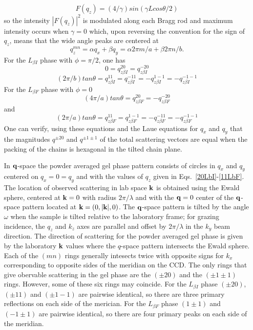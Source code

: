 \documentclass[
 preprint,
 showkeys, 
 amsmath,
 amssymb,
 aps,
]{revtex4-1}
\begin{document}
\begin{equation}\label{int}
F(q_z) = (4/\gamma)sin({\gamma}Lcos{\theta}/2)
\end{equation}
so the intensity $|F(q_z)|^2$ is modulated along each Bragg rod and maximum intensity occurs when $\gamma=0$ which, upon reversing the convention for the sign of $q_z$, means that the wide angle peaks are centered at
\begin{equation}\label{centers}
q_z^{mn}={\alpha}q_x+{\beta}q_y=\alpha2\pi{m}/a+\beta2\pi{n}/b.
\end{equation}
For the $L_{{\beta}I}$ phase with ${\phi}={\pi}/2$, one has
\begin{equation}\label{20LbI}
0=q_{z{\beta}I}^{20}=q_{z{\beta}I}^{-20}
\end{equation}
\begin{equation}\label{11LbI}
(2\pi/b)tan{\theta}=q_{z{\beta}I}^{11}=q_{z{\beta}I}^{-11}=-q_{z{\beta}I}^{1-1}=-q_{z{\beta}I}^{-1-1}
\end{equation}
For the $L_{{\beta}F}$ phase with ${\phi}=0$
\begin{equation}\label{20LbF}
(4\pi/a)tan{\theta}=q_{z{\beta}F}^{20}=-q_{z{\beta}F}^{-20}
\end{equation}
and
\begin{equation}\label{11LbF}
(2\pi/a)tan{\theta}=q_{z{\beta}F}^{11}=q_{z{\beta}F}^{1-1}=-q_{z{\beta}F}^{-11}=-q_{z{\beta}F}^{-1-1}
\end{equation}
One can verify, using these equations and the Laue equations for $q_x$ and $q_y$ that the magnitudes $q^{{\pm}20}$ and $q^{{\pm}1{\pm}1}$ of the total scattering vectors are equal when the packing of the chains is hexagonal in the tilted chain plane.  

In $\bold{q}$-space the powder averaged gel phase pattern consists of circles in $q_x$ and $q_y$ centered on $q_x=0=q_y$ and with the values of $q_z$ given in Eqs.~\ref{20LbI}-\ref{11LbF}.  
The location of observed scattering in lab space $\bold{k}$ is obtained using the Ewald sphere, centered at $\bold{k}=0$ with radius $2\pi/\lambda$ and with the $\bold{q}=0$ center of the $\bold{q}$-space pattern located at $\bold{k}=(0,|\bold{k}|,0)$.  The $\bold{q}$-space pattern is tilted by the angle $\omega$ when the sample is tilted relative to the laboratory frame; for grazing incidence, the $q_z$ and $k_z$ axes are parallel and offset by $2\pi/\lambda$ in the $k_y$ beam direction.  The direction of scattering for the powder averaged gel phase is given by the laboratory $\bold{k}$ values where the $q$-space pattern intersects the Ewald sphere.  Each of the $(mn)$ rings generally intesects twice with opposite signs for $k_x$ corresponding to opposite sides of the meridian on the CCD.  The only rings that give obervable scattering in the gel phase are the $(\pm20)$ and the $(\pm1\pm1)$ rings.  However, some of these six rings may coincide. For the $L_{{\beta}I}$ phase $(\pm20)$, $(\pm11)$ and $(\pm1-1)$ are pairwise identical, so there are three primary reflections on each side of the merician. For the $L_{{\beta}F}$ phase $(1\pm1)$ and $(-1\pm1)$ are pairwise identical, so there are four primary peaks on each side of the meridian.
\end{document}
